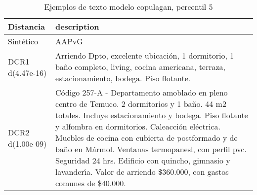 \begin{table}[H]
\centering
\fontsize{10}{14}\selectfont
\caption{Ejemplos de texto modelo copulagan, percentil 5}
\label{table-example-economicos-b-2-copulagan-5p-text}
\begin{tabular}{|l|m{35em}|}
\hline
\rowcolor[gray]{0.8}
Distancia & description \\
\hline Sintético & AAPvG \\
\hline DCR1 d(4.47e-16) & Arriendo Dpto, excelente ubicaci\'on, 1 dormitorio, 1 ba\~no completo, living, cocina americana, terraza, estacionamiento, bodega. Piso flotante.   \\
\hline DCR2 d(1.00e-09) & C\'odigo 257-A - Departamento amoblado en pleno centro de Temuco. 2 dormitorios y 1 ba\~no. 44 m2 totales. Incluye estacionamiento y bodega. Piso flotante y alfombra en dormitorios. Caleacci\'on el\'ectrica. Muebles de cocina con cubierta de postformado y de ba\~no en M\'armol. Ventanas termopanesl, con perfil pvc. Seguridad 24 hrs. Edificio con quincho, gimnasio y lavander{\'\i}a. Valor de arriendo \$360.000, con gastos comunes de \$40.000. \\
\hline
\end{tabular}
\end{table}
